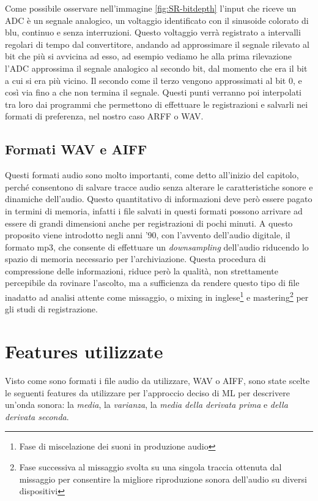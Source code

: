Come possibile osservare nell'immagine \ref{fig:SR-bitdepth} l'input che riceve un ADC è un segnale analogico, un voltaggio identificato con il sinusoide colorato di blu, continuo e senza interruzioni. Questo voltaggio verrà registrato a intervalli regolari di tempo dal convertitore, andando ad approssimare il segnale rilevato al bit che più si avvicina ad esso, ad esempio vediamo he alla prima rilevazione l'ADC approssima il segnale analogico al secondo bit, dal momento che era il bit a cui si era più vicino. Il secondo come il terzo vengono approssimati al bit 0, e così via fino a che non termina il segnale. Questi punti verranno poi interpolati tra loro dai programmi che permettono di effettuare le registrazioni e salvarli nei formati di preferenza, nel nostro caso ARFF o WAV. 

\subsection{Formati WAV e AIFF}
Questi formati audio sono molto importanti, come detto all'inizio del capitolo, perché consentono di salvare tracce audio senza alterare le caratteristiche sonore e dinamiche dell'audio. Questo quantitativo di informazioni deve però essere pagato in termini di memoria, infatti i file salvati in questi formati possono arrivare ad essere di grandi dimensioni anche per registrazioni di pochi minuti. A questo proposito viene introdotto negli anni '90, con l'avvento dell'audio digitale, il formato mp3, che consente di effettuare un \emph{downsampling} dell'audio riducendo lo spazio di memoria necessario per l'archiviazione. Questa procedura di compressione delle informazioni, riduce però la qualità, non strettamente percepibile da rovinare l'ascolto, ma a sufficienza da rendere questo tipo di file inadatto ad analisi attente come missaggio, o mixing in inglese\footnote{Fase di miscelazione dei suoni in produzione audio} e mastering\footnote{Fase successiva al missaggio svolta su una singola traccia ottenuta dal missaggio per consentire la migliore riproduzione sonora dell'audio su diversi dispositivi} per gli studi di registrazione.

\section{Features utilizzate}
Visto come sono formati i file audio da utilizzare, WAV o AIFF, sono state scelte le seguenti features da utilizzare per l'approccio deciso di ML per descrivere un'onda sonora: la \emph{media}, la \emph{varianza}, la \emph{media della derivata prima} e  \emph{della derivata seconda}.



%
